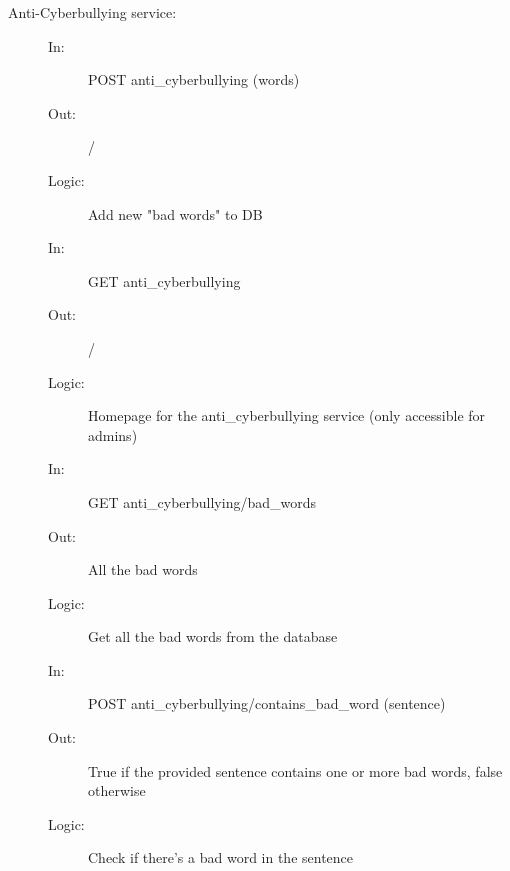 \documentclass{article}
\begin{document}
\begin{description}
    \item [Anti-Cyberbullying service:]
    \begin{description}
        \item[]
        \item[In:] POST anti\_cyberbullying (words)
        \item[Out:] /
        \item[Logic:] Add new "bad words" to DB
        \item[]
        
        \item[In:] GET anti\_cyberbullying
        \item[Out:] /
        \item[Logic:] Homepage for the anti\_cyberbullying service (only accessible for admins)
        \item[]
        
        \item[In:] GET anti\_cyberbullying/bad\_words
        \item[Out:] All the bad words
        \item[Logic:] Get all the bad words from the database
        \item[]
        
        \item[In:] POST anti\_cyberbullying/contains\_bad\_word (sentence)
        \item[Out:] True if the provided sentence contains one or more bad words, false otherwise
        \item[Logic:] Check if there's a bad word in the sentence
    \end{description}
\end{description}
\end{document}
